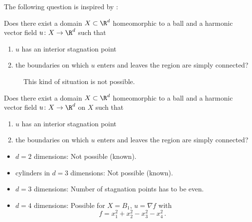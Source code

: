 \begin{frame}
  The following question is inspired by \cite{Alber1992}:
  \begin{question} \label{qu:flowthroughStagnationPoint}
		Does there exist a domain $X\subset\R^d$ homeomorphic to a ball and a harmonic vector field $u\colon X\to\R^d$ such that
		\begin{enumerate}
		  \item $u$ has an interior stagnation point
		  \item the boundaries on which $u$ enters and leaves the region are simply connected?
		\end{enumerate}
	\end{question}
\end{frame}

\begin{frame}
  \begin{figure}
    \centering
    
    \caption{This kind of situation is not possible.}
    \label{fi:n3_cylinder}
  \end{figure}
\end{frame}

\begin{frame}
	\begin{question} \label{qu:flowthroughStagnationPoint}
		Does there exist a domain $X\subset\R^d$ homeomorphic to a ball and a harmonic vector field $u\colon X\to\R^d$ on $X$ such that
		\begin{enumerate}
		  \item $u$ has an interior stagnation point
		  \item the boundaries on which $u$ enters and leaves the region are simply connected?
		\end{enumerate}
	\end{question}
  \begin{answer}
  \begin{itemize}
    \item $d=2$ dimensions: Not possible (known).
    \item cylinders in $d=3$ dimensions: Not possible (known).
    \item $d=3$ dimensions: Number of stagnation points has to be even.
    \item $d=4$ dimensions: Possible for $X=B_1$, $u=\nabla f$ with $$f=x_1^2+x_2^2-x_3^2-x_4^2\,.$$
  \end{itemize}
\end{answer}
\end{frame}

